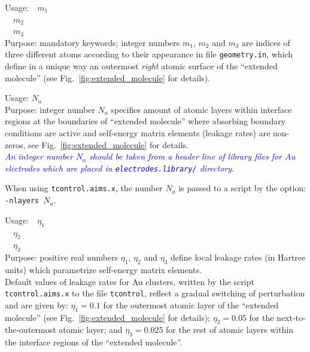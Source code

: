 {
 \noindent 
 Usage:\ \ $m_1$ \\ 
 \phantom{Usage:}\ \ $m_2$ \\ 
 \phantom{Usage:}\ \ $m_3$ \\[1.0ex] 
 Purpose: mandatory keywords; integer numbers $m_1$, $m_2$
 and $m_3$ are indices of three different atoms according to their
 appearance in file \texttt{geometry.in}, which define in a unique way
 an outermost \textit{right} atomic surface of the ``extended molecule''
 (see Fig.~\ref{fig:extended_molecule} for details). \\
}


{
 \noindent 
 Usage: \quad $N_a$ \\[1.0ex] 
 Purpose: integer number $N_a$ specifies amount of atomic layers within 
 interface regions at the boundaries of ``extended molecule'' where 
 absorbing boundary conditions are active and self-energy matrix elements
 (leakage rates) are non-zeros, see Fig.~\ref{fig:extended_molecule}
 for details. \\
}
\emph{\textcolor{blue}{ An integer number $N_a$ should be taken from
a header line of library files for Au electrodes which are placed in
\texttt{electrodes.library/} directory.}}

When using \texttt{tcontrol.aims.x}, the number $N_a$ is passed to a
script by the option: \texttt{-nlayers}\ $N_a$.


{
 \noindent 
 Usage:\ \ $\eta_1$ \\ 
 \phantom{Usage:}\ \ $\eta_2$ \\ 
 \phantom{Usage:}\ \ $\eta_3$ \\ [1.0ex] 
 Purpose: positive real numbers $\eta_1$, $\eta_2$ and $\eta_3$ 
 define local leakage rates (in Hartree units) which parametrize 
 self-energy matrix elements.  \\
}
Default values of leakage rates for Au clusters, written by the script
\texttt{tcontrol.aims.x} to the file \texttt{tcontrol}, reflect a
gradual switching of perturbation and are given by: $\eta_1 = 0.1$
for the outermost atomic layer of the ``extended molecule'' (see
Fig.~\ref{fig:extended_molecule} for details); $\eta_2 = 0.05$ for the
next-to-the-outermost atomic layer; and $\eta_3 = 0.025$ for the rest of
atomic layers within the interface regions of the ``extended molecule''.

